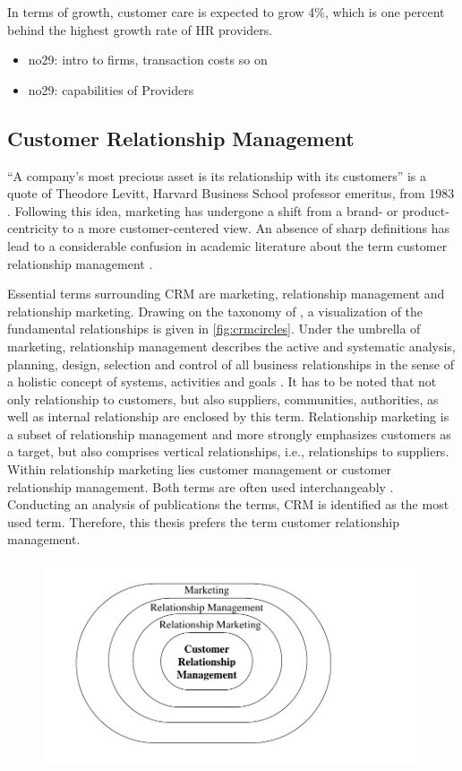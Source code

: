 		In terms of growth, customer care is expected to grow 4\%, which is one percent behind the highest growth rate of HR providers. 
		
	
		
		
		\begin{itemize}
			\item no29: intro to firms, transaction costs so on
			\item no29: capabilities of Providers
		\end{itemize}
		\subsection{Customer Relationship Management}
		\enquote{A company's most precious asset is its relationship with its customers} is a quote of Theodore Levitt, Harvard Business School professor emeritus, from 1983 \cite{levitt1983}. Following this idea, marketing has undergone a shift from a brand- or product-centricity to a more customer-centered view. An absence of sharp definitions has lead to a considerable confusion in academic literature about the term customer relationship management  \cite{paynefrow2005}. 
		
		Essential terms surrounding CRM are marketing, relationship management and relationship marketing. Drawing on the taxonomy of \cite{hippnerwilde2011}, a visualization of the fundamental relationships is given in \Fig \ref{fig:crmcircles}. Under the umbrella of marketing, relationship management describes the active and systematic analysis, planning, design, selection and control of all business relationships in the sense of a holistic concept of systems, activities and goals \citep[]{diller1995}. It has to be noted that not only relationship to customers, but also suppliers, communities, authorities, as well as internal relationship are enclosed by this term. Relationship marketing is a subset of relationship management and more strongly emphasizes customers as a target, but also comprises vertical relationships, i.e., relationships to suppliers. Within relationship marketing lies customer management or customer relationship management. Both terms are often used interchangeably  \cite{Leuer2011,ryals2001customer}. Conducting an analysis of publications \wrt the terms, \acrshort{CRM} is identified as the most used term. Therefore, this thesis prefers the term customer relationship management.
		
		\begin{figure}[caption={CRM in the field of marketing}, label={fig:crmcirlces}]
			{	\includegraphics[width=.8\textwidth]{figures/crmcircles.pdf}}
		\end{figure}
	
